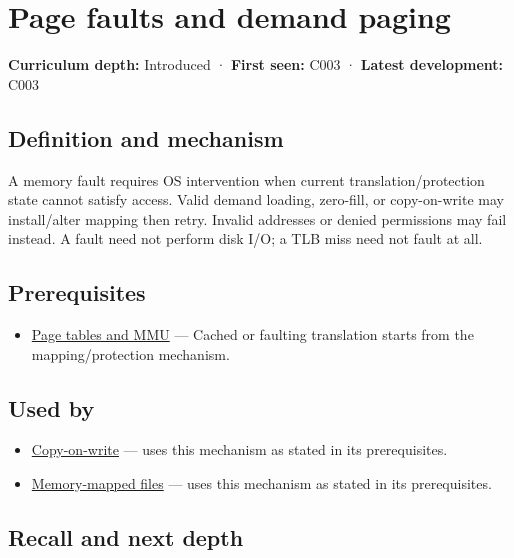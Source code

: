 \hypertarget{appendix-cc0909a7ef14}{}\label{referencestart:appendix-cc0909a7ef14}
\section{Page faults and demand paging}\label{appendix-cc0909a7ef14-page-faults-and-demand-paging}

\textbf{Curriculum depth:} Introduced · \textbf{First seen:} C003 · \textbf{Latest development:} C003

\subsection{Definition and mechanism}\label{appendix-cc0909a7ef14-definition-and-mechanism}

A memory fault requires OS intervention when current translation/protection state cannot satisfy access. Valid demand loading, zero-fill, or copy-on-write may install/alter mapping then retry. Invalid addresses or denied permissions may fail instead. A fault need not perform disk I/O; a TLB miss need not fault at all.

\subsection{Prerequisites}\label{appendix-cc0909a7ef14-prerequisites}

\begin{itemize}
\tightlist
\item
  \hyperref[appendix-01e5905165c4]{Page tables and MMU} --- Cached or faulting translation starts from the mapping/protection mechanism.
\end{itemize}

\subsection{Used by}\label{appendix-cc0909a7ef14-used-by}

\begin{itemize}
\tightlist
\item
  \hyperref[appendix-7a06e5baac04]{Copy-on-write} --- uses this mechanism as stated in its prerequisites.
\item
  \hyperref[appendix-313ee7a0ba7b]{Memory-mapped files} --- uses this mechanism as stated in its prerequisites.
\end{itemize}

\subsection{Recall and next depth}\label{appendix-cc0909a7ef14-recall-and-next-depth}

